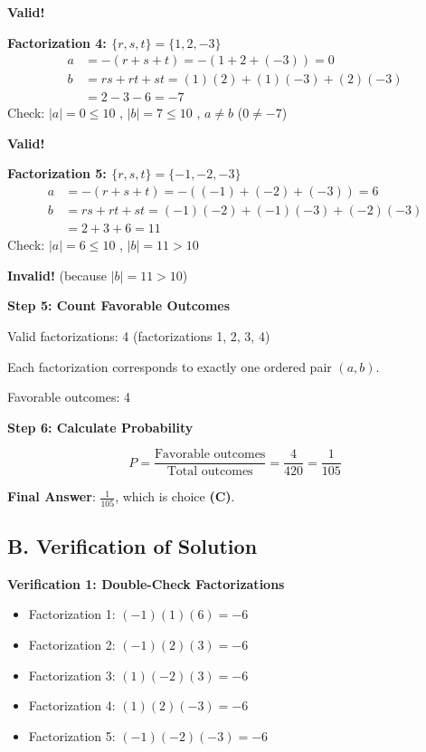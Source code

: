 \documentclass[12pt]{article}
\begin{document}
\begin{solutionbox}
\textbf{Valid!}

\vspace{0.2cm}

\textbf{Factorization 4: $\{r, s, t\} = \{1, 2, -3\}$}
\begin{align*}
    a &= -(r + s + t) = -(1 + 2 + (-3)) = 0 \\
    b &= rs + rt + st = (1)(2) + (1)(-3) + (2)(-3) \\
      &= 2 - 3 - 6 = -7
\end{align*}
Check: $|a| = 0 \leq 10$ \checkmark, $|b| = 7 \leq 10$ \checkmark, $a \neq b$ ($0 \neq -7$) \checkmark

\textbf{Valid!}

\vspace{0.2cm}

\textbf{Factorization 5: $\{r, s, t\} = \{-1, -2, -3\}$}
\begin{align*}
    a &= -(r + s + t) = -((-1) + (-2) + (-3)) = 6 \\
    b &= rs + rt + st = (-1)(-2) + (-1)(-3) + (-2)(-3) \\
      &= 2 + 3 + 6 = 11
\end{align*}
Check: $|a| = 6 \leq 10$ \checkmark, $|b| = 11 > 10$ \texttimes

\textbf{Invalid!} (because $|b| = 11 > 10$)

\vspace{0.3cm}

\textbf{Step 5: Count Favorable Outcomes}

Valid factorizations: 4 (factorizations 1, 2, 3, 4)

Each factorization corresponds to exactly one ordered pair $(a, b)$.

Favorable outcomes: 4

\vspace{0.3cm}

\textbf{Step 6: Calculate Probability}

$$P = \frac{\text{Favorable outcomes}}{\text{Total outcomes}} = \frac{4}{420} = \frac{1}{105}$$

\textbf{Final Answer}: $\frac{1}{105}$, which is choice \textbf{(C)}.

\subsection*{B. Verification of Solution}

\textbf{Verification 1: Double-Check Factorizations}

\begin{itemize}
    \item Factorization 1: $(-1)(1)(6) = -6$ \checkmark
    \item Factorization 2: $(-1)(2)(3) = -6$ \checkmark
    \item Factorization 3: $(1)(-2)(3) = -6$ \checkmark
    \item Factorization 4: $(1)(2)(-3) = -6$ \checkmark
    \item Factorization 5: $(-1)(-2)(-3) = -6$ \checkmark
\end{itemize}


\end{solutionbox}
\end{document}
